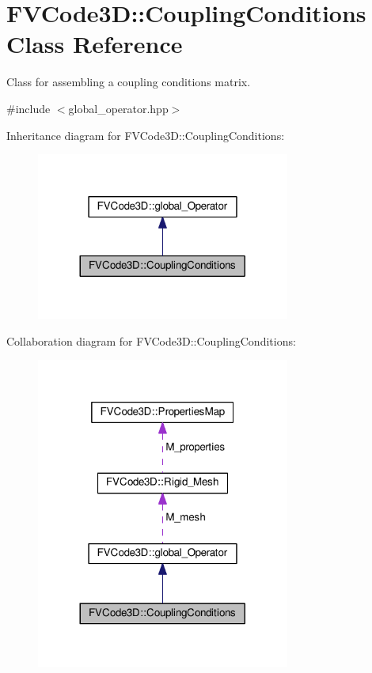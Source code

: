 \hypertarget{classFVCode3D_1_1CouplingConditions}{}\section{F\+V\+Code3D\+:\+:Coupling\+Conditions Class Reference}
\label{classFVCode3D_1_1CouplingConditions}


Class for assembling a coupling conditions matrix.  




{\ttfamily \#include $<$global\+\_\+operator.\+hpp$>$}



Inheritance diagram for F\+V\+Code3D\+:\+:Coupling\+Conditions\+:
\nopagebreak
\begin{figure}[H]
\begin{center}
\leavevmode
\includegraphics[width=236pt]{classFVCode3D_1_1CouplingConditions__inherit__graph}
\end{center}
\end{figure}


Collaboration diagram for F\+V\+Code3D\+:\+:Coupling\+Conditions\+:
\nopagebreak
\begin{figure}[H]
\begin{center}
\leavevmode
\includegraphics[width=236pt]{classFVCode3D_1_1CouplingConditions__coll__graph}
\end{center}
\end{figure}
